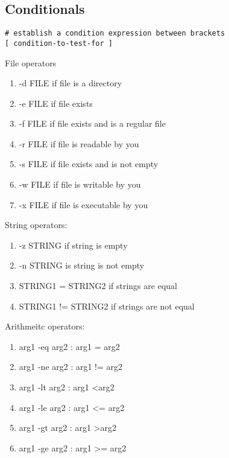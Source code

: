 \documentclass[12pt,a4paper]{article}
\begin{document}
\subsection{Conditionals}
\begin{footnotesize}
\begin{verbatim}
# establish a condition expression between brackets
[ condition-to-test-for ]
\end{verbatim}
\end{footnotesize}
File operators
\begin{enumerate}
	\item -d FILE if file is a directory
	\item -e FILE if file exists
	\item -f FILE if file exists and is a regular file
	\item -r FILE if file is readable by you
	\item -s FILE if file exists and is not empty
	\item -w FILE if file is writable by you
	\item -x FILE if file is executable by you 
\end{enumerate}
String operators:
\begin{enumerate}
	\item -z STRING if string is empty
	\item -n STRING is string is not empty
	\item STRING1 = STRING2 if strings are equal
	\item STRING1 != STRING2 if strings are not equal
\end{enumerate}
Arithmeitc operators:
\begin{enumerate}
	\item arg1 -eq arg2 : arg1 = arg2
	\item arg1 -ne arg2 : arg1 != arg2
	\item arg1 -lt arg2 : arg1 \textless arg2
	\item arg1 -le arg2 : arg1 \textless= arg2
	\item arg1 -gt arg2 : arg1 \textgreater arg2
	\item arg1 -ge arg2 : arg1 \textgreater= arg2
\end{enumerate}
\end{document}
